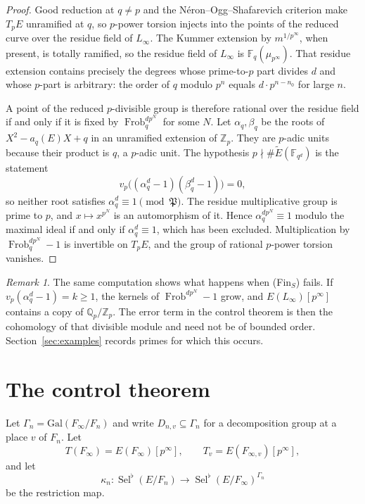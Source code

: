 \documentclass[11pt]{article}
\theoremstyle{definition}
\theoremstyle{remark}
\newtheorem{remark}[theorem]{Remark}
\newcommand{\Z}{\mathbb{Z}}
\newcommand{\Q}{\mathbb{Q}}
\newcommand{\F}{\mathbb{F}}
\newcommand{\Gal}{\mathrm{Gal}}
\newcommand{\Sel}{\operatorname{Sel}}
\newcommand{\Frob}{\operatorname{Frob}}
\newcommand{\flatp}{\flat}
\begin{document}
\begin{proof}
Good reduction at \(q\neq p\) and the N\'eron--Ogg--Shafarevich criterion make \(T_pE\) unramified at \(q\), so \(p\)-power torsion injects into the points of the reduced curve over the residue field of \(L_\infty\). The Kummer extension by \(m^{1/p^\infty}\), when present, is totally ramified, so the residue field of \(L_\infty\) is \(\F_q(\mu_{p^\infty})\). That residue extension contains precisely the degrees whose prime-to-\(p\) part divides \(d\) and whose \(p\)-part is arbitrary: the order of \(q\) modulo \(p^n\) equals \(d\cdot p^{n-n_0}\) for large \(n\).

A point of the reduced \(p\)-divisible group is therefore rational over the residue field if and only if it is fixed by \(\Frob_q^{d p^N}\) for some \(N\). Let \(\alpha_q,\beta_q\) be the roots of \(X^2-a_q(E)X+q\) in an unramified extension of \(\Z_p\). They are \(p\)-adic units because their product is \(q\), a \(p\)-adic unit. The hypothesis \(p\nmid\#\widetilde{E}(\F_{q^d})\) is the statement
\[
v_p\bigl((\alpha_q^d-1)(\beta_q^d-1)\bigr)=0,
\]
so neither root satisfies \(\alpha_q^d\equiv 1\pmod{\mathfrak{P}}\). The residue multiplicative group is prime to \(p\), and \(x\mapsto x^{p^N}\) is an automorphism of it. Hence \(\alpha_q^{d p^N}\equiv 1\) modulo the maximal ideal if and only if \(\alpha_q^d\equiv 1\), which has been excluded. Multiplication by \(\Frob_q^{d p^N}-1\) is invertible on \(T_pE\), and the group of rational \(p\)-power torsion vanishes.
\end{proof}

\begin{remark}
The same computation shows what happens when (Fin\(_S\)) fails. If \(v_p(\alpha_q^d-1)=k\ge 1\), the kernels of \(\Frob^{d p^N}-1\) grow, and \(E(L_\infty)[p^\infty]\) contains a copy of \(\Q_p/\Z_p\). The error term in the control theorem is then the cohomology of that divisible module and need not be of bounded order. Section~\ref{sec:examples} records primes for which this occurs.
\end{remark}

\section{The control theorem}
\label{sec:control}

Let \(\Gamma_n=\Gal(F_\infty/F_n)\) and write \(D_{n,v}\subseteq\Gamma_n\) for a decomposition group at a place \(v\) of \(F_n\). Let
\[
T(F_\infty)=E(F_\infty)[p^\infty],\qquad
T_v=E(F_{\infty,v})[p^\infty],
\]
and let
\[
\kappa_n:\Sel^{\flatp}(E/F_n)\longrightarrow\Sel^{\flatp}(E/F_\infty)^{\Gamma_n}
\]
be the restriction map.
\end{document}
